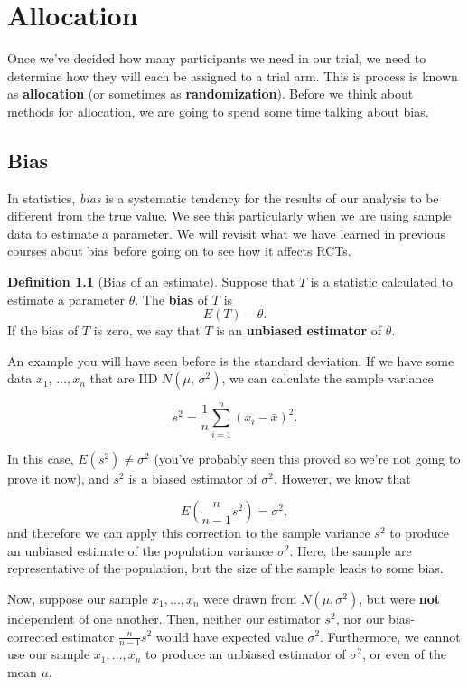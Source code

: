 \documentclass[
  openany]{book}
\theoremstyle{definition}
\newtheorem{definition}{Definition}[chapter]
\theoremstyle{definition}
\theoremstyle{definition}
\theoremstyle{definition}
\theoremstyle{remark}
\begin{document}
\chapter{Allocation}\label{alloc}

Once we've decided how many participants we need in our trial, we need to determine how they will each be assigned to a trial arm. This is process is known as \textbf{allocation} (or sometimes as \textbf{randomization}). Before we think about methods for allocation, we are going to spend some time talking about bias.

\section{Bias}\label{bias}

In statistics, \emph{bias} is a systematic tendency for the results of our analysis to be different from the true value. We see this particularly when we are using sample data to estimate a parameter. We will revisit what we have learned in previous courses about bias before going on to see how it affects RCTs.

\begin{definition}[Bias of an estimate]
Suppose that \(T\) is a statistic calculated to estimate a parameter \(\theta\). The \textbf{bias} of \(T\) is \[E\left(T\right) - \theta.\] If the bias of \(T\) is zero, we say that \(T\) is an \textbf{unbiased estimator} of \(\theta\).
\end{definition}

An example you will have seen before is the standard deviation. If we have some data \(x_1,\,\ldots,x_n\) that are IID \(N\left(\mu,\,\sigma^2\right)\), we can calculate the sample variance

\[ s^2 = \frac{1}{n}\sum\limits_{i=1}^n\left(x_i - \bar{x}\right)^2 .\]

In this case, \(E\left(s^2\right) \neq {\sigma^2}\) (you've probably seen this proved so we're not going to prove it now), and \(s^2\) is a biased estimator of \(\sigma^2\). However, we know that

\[E \left(\frac{n}{n-1}s^2\right) = \sigma^2,\]
and therefore we can apply this correction to the sample variance \(s^2\) to produce an unbiased estimate of the population variance \(\sigma^2\). Here, the sample are representative of the population, but the size of the sample leads to some bias.

Now, suppose our sample \(x_1,\ldots,x_n\) were drawn from \(N\left(\mu,\sigma^2\right)\), but were \textbf{not} independent of one another. Then, neither our estimator \(s^2\), nor our bias-corrected estimator \(\frac{n}{n-1}s^2\) would have expected value \(\sigma^2\). Furthermore, we cannot use our sample \(x_1,\ldots,x_n\) to produce an unbiased estimator of \(\sigma^2\), or even of the mean \(\mu\).
\end{document}
